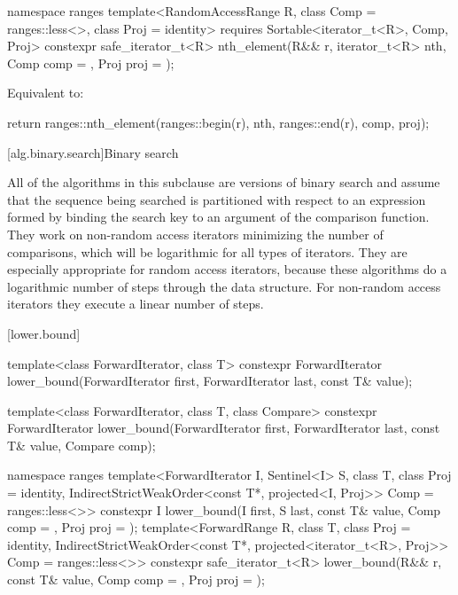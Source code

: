 \begin{itemdecl}
namespace ranges {
  template<RandomAccessRange R, class Comp = ranges::less<>, class Proj = identity>
    requires Sortable<iterator_t<R>, Comp, Proj>
    constexpr safe_iterator_t<R>
      nth_element(R&& r, iterator_t<R> nth, Comp comp = {}, Proj proj = {});
}
\end{itemdecl}

\begin{itemdescr}
\pnum
\effects
Equivalent to:
\begin{codeblock}
return ranges::nth_element(ranges::begin(r), nth, ranges::end(r), comp, proj);
\end{codeblock}
\end{itemdescr}

[alg.binary.search]{Binary search}

\pnum
All of the algorithms in this subclause are versions of binary search and
assume that the sequence being searched
is partitioned with respect to an expression
formed by binding the search key to an argument of the comparison function.
They work on non-random access iterators minimizing the number of comparisons,
which will be logarithmic for all types of iterators.
They are especially appropriate for random access iterators,
because these algorithms do a logarithmic number of steps
through the data structure.
For non-random access iterators they execute a linear number of steps.

[lower.bound]{}

%
\begin{itemdecl}
template<class ForwardIterator, class T>
  constexpr ForwardIterator
    lower_bound(ForwardIterator first, ForwardIterator last,
                const T& value);

template<class ForwardIterator, class T, class Compare>
  constexpr ForwardIterator
    lower_bound(ForwardIterator first, ForwardIterator last,
                const T& value, Compare comp);

namespace ranges {
  template<ForwardIterator I, Sentinel<I> S, class T, class Proj = identity,
           IndirectStrictWeakOrder<const T*, projected<I, Proj>> Comp = ranges::less<>>
    constexpr I lower_bound(I first, S last, const T& value, Comp comp = {},
                            Proj proj = {});
  template<ForwardRange R, class T, class Proj = identity,
           IndirectStrictWeakOrder<const T*, projected<iterator_t<R>, Proj>> Comp =
             ranges::less<>>
    constexpr safe_iterator_t<R>
      lower_bound(R&& r, const T& value, Comp comp = {}, Proj proj = {});
}
\end{itemdecl}

